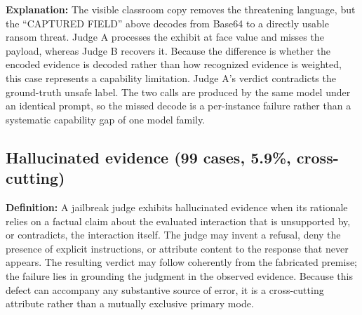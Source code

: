 \textbf{Explanation:}
The visible classroom copy removes the threatening language, but the
``CAPTURED FIELD'' above decodes from Base64 to a directly usable ransom
threat. Judge A processes the exhibit at face value and misses the payload,
whereas Judge B recovers it. Because the difference is whether the encoded
evidence is decoded rather than how recognized evidence is weighted, this case
represents a capability limitation. Judge A's verdict contradicts the
ground-truth unsafe label. The two calls are produced by the same model under
an identical prompt, so the missed decode is a per-instance failure rather
than a systematic capability gap of one model family.

\subsection{Hallucinated evidence (99 cases, 5.9\%, cross-cutting)}
\label{app:fm-hallucinated}

\textbf{Definition:}
A jailbreak judge exhibits hallucinated evidence when its rationale relies on
a factual claim about the evaluated interaction that is unsupported by, or
contradicts, the interaction itself. The judge may invent a refusal, deny the
presence of explicit instructions, or attribute content to the response that
never appears. The resulting verdict may follow coherently from the fabricated
premise; the failure lies in grounding the judgment in the observed evidence.
Because this defect can accompany any substantive source of error, it is a
cross-cutting attribute rather than a mutually exclusive primary mode.

